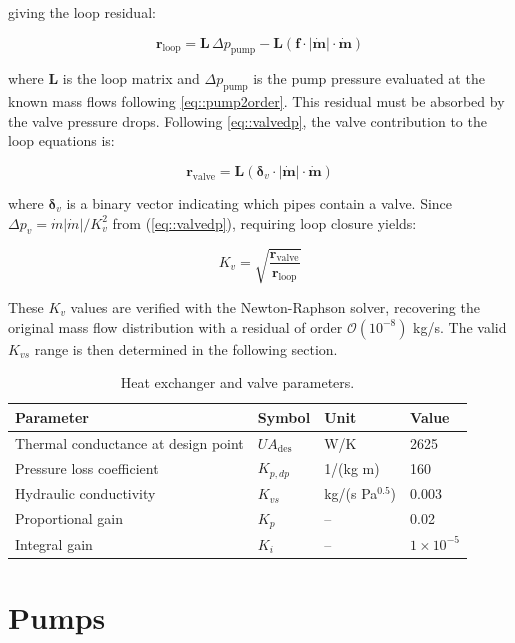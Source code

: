 \noindent giving the loop residual:

\begin{equation}
    \mathbf{r}_{\text{loop}} = \mathbf{L}\,\Delta p_{\text{pump}} - 
    \mathbf{L}\left(\mathbf{f} \cdot |\dot{\mathbf{m}}| \cdot \dot{\mathbf{m}}\right)
\end{equation}

\noindent where $\mathbf{L}$ is the loop matrix and $\Delta p_{\text{pump}}$ is the pump pressure evaluated at the known mass flows following \ref{eq::pump2order}. This residual must be absorbed by the valve pressure drops. Following \ref{eq::valvedp}, the valve contribution to the loop equations is:

\begin{equation}
    \mathbf{r}_{\text{valve}} = \mathbf{L}\left(\boldsymbol{\delta}_v \cdot 
    |\dot{\mathbf{m}}| \cdot \dot{\mathbf{m}}\right)
\end{equation}

\noindent where $\boldsymbol{\delta}_v$ is a binary vector indicating which pipes 
contain a valve. Since $\Delta p_v = \dot{m}|\dot{m}| / K_v^2$ from 
(\ref{eq::valvedp}), requiring loop closure yields:

\begin{equation}
    K_v = \sqrt{\frac{\mathbf{r}_{\text{valve}}}{\mathbf{r}_{\text{loop}}}}
    \label{eq:Kv_fit}
\end{equation}

\noindent These $K_v$ values are verified with the Newton-Raphson solver, 
recovering the original mass flow distribution with a residual of order 
$\mathcal{O}(10^{-8})$ kg/s. The valid $K_{vs}$ range is then determined in the following section.


\begin{table}[h!]
\centering
\caption{Heat exchanger and valve parameters.}
\label{tab:hex_constants}
\begin{tabular}{llll}
\hline
\textbf{Parameter} & \textbf{Symbol} & \textbf{Unit} & \textbf{Value} \\
\hline
Thermal conductance at design point  & $UA_{\text{des}}$            & W/K        & 2625    \\
Pressure loss coefficient          & $K_{p,dp}$     & 1/(kg m)          & 160     \\
Hydraulic conductivity & $K_{vs}$       & kg/(s Pa$^{0.5}$) & 0.003   \\
Proportional gain                  & $K_p$          & --                & 0.02    \\
Integral gain                      & $K_i$          & --                & $1\times10^{-5}$ \\

\hline
\end{tabular}
\end{table}


\section{Pumps}